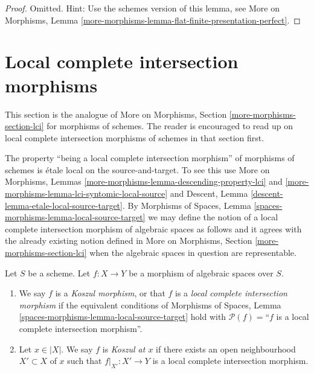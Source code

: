 \begin{proof}
Omitted. Hint: Use the schemes version of this lemma, see
More on Morphisms,
Lemma \ref{more-morphisms-lemma-flat-finite-presentation-perfect}.
\end{proof}









\section{Local complete intersection morphisms}
\label{section-lci}

\noindent
This section is the analogue of
More on Morphisms, Section \ref{more-morphisms-section-lci}
for morphisms of schemes. The reader is encouraged to read up
on local complete intersection morphisms of schemes in that section first.

\medskip\noindent
The property ``being a local complete intersection morphism'' of morphisms
of schemes is \'etale local on the source-and-target. To see this use
More on Morphisms,
Lemmas \ref{more-morphisms-lemma-descending-property-lci} and
\ref{more-morphisms-lemma-lci-syntomic-local-source}
and
Descent, Lemma \ref{descent-lemma-etale-local-source-target}.
By
Morphisms of Spaces,
Lemma \ref{spaces-morphisms-lemma-local-source-target}
we may define the notion of a local complete intersection morphism
of algebraic spaces as follows and it agrees with the already existing
notion defined in
More on Morphisms, Section \ref{more-morphisms-section-lci}
when the algebraic spaces in question are representable.

\begin{definition}
\label{definition-lci}
Let $S$ be a scheme.
Let $f : X \to Y$ be a morphism of algebraic spaces over $S$.
\begin{enumerate}
\item We say $f$ is a {\it Koszul morphism}, or that $f$ is a
{\it local complete intersection morphism} if the equivalent conditions of
Morphisms of Spaces, Lemma \ref{spaces-morphisms-lemma-local-source-target}
hold with $\mathcal{P}(f) =$``$f$ is a local complete intersection morphism''.
\item Let $x \in |X|$. We say $f$ is {\it Koszul at $x$} if
there exists an open neighbourhood $X' \subset X$ of $x$ such
that $f|_{X'} : X' \to Y$ is a local complete intersection morphism.
\end{enumerate}
\end{definition}

